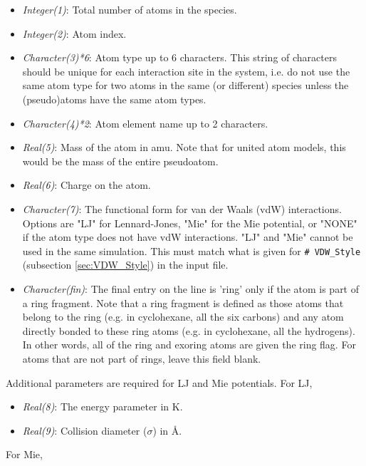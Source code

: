 \begin{itemize} 
%
\item {\it Integer(1)}: Total number of atoms in the species. 
%
\item {\it Integer(2)}: Atom index. 
%
\item {\it Character(3)*6}: Atom type up to 6 characters. This string of characters should be
unique for each interaction site in the system, i.e. do not use the same atom type
for two atoms in the same (or different) species unless the (pseudo)atoms have the same atom types. 
%
\item {\it Character(4)*2}: Atom element name up to 2 characters. 
%
\item {\it Real(5)}: Mass of the atom in amu. Note that for united atom models, this would be the
mass of the entire pseudoatom. 
%
\item {\it Real(6)}: Charge on the atom.
%
\item {\it Character(7)}: The functional form for van der Waals (vdW) interactions.
Options are "LJ" for Lennard-Jones, "Mie" for the Mie potential, 
or "NONE" if the atom type does not have vdW interactions.
"LJ" and "Mie" cannot be used in the same simulation.
This must match what is given for \texttt{\# VDW\_Style}  
(subsection \ref{sec:VDW_Style}) in the input file.  

\item {\it Character(fin)}: The final entry on the line is 'ring' only if the atom is part 
of a ring fragment. 
Note that a ring fragment is defined as 
those atoms that belong to the ring (e.g. in cyclohexane, all the six carbons) 
and any atom directly bonded to these ring atoms (e.g. in cyclohexane, all the hydrogens).  
In other words, all of the ring and exoring atoms are given the ring flag. 
For atoms that are not part of rings, leave this field blank. 
\end{itemize} 
Additional parameters are required for LJ and Mie potentials. For LJ,
%
\begin{itemize} 
\item {\it Real(8)}: The energy parameter in K.
%
\item {\it Real(9)}: Collision diameter ($\sigma$)  in \AA.
\end{itemize} 
%
For Mie,


